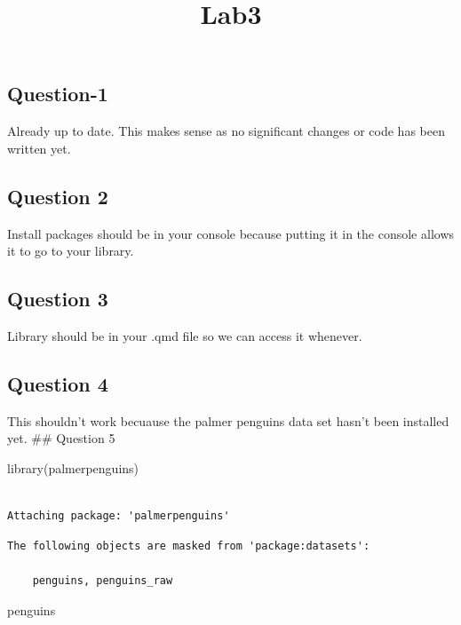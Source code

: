 \documentclass[
  letterpaper,
  DIV=11,
  numbers=noendperiod]{scrartcl}
\title{Lab3}
\author{}
\date{}
\newenvironment{Shaded}{\begin{snugshade}}{\end{snugshade}}
\newcommand{\FunctionTok}[1]{\textcolor[rgb]{0.28,0.35,0.67}{#1}}
\newcommand{\NormalTok}[1]{\textcolor[rgb]{0.00,0.23,0.31}{#1}}
\begin{document}
\maketitle


\subsection{Question-1}\label{question-1}

Already up to date. This makes sense as no significant changes or code
has been written yet.

\subsection{Question 2}\label{question-2}

Install packages should be in your console because putting it in the
console allows it to go to your library.

\subsection{Question 3}\label{question-3}

Library should be in your .qmd file so we can access it whenever.

\subsection{Question 4}\label{question-4}

This shouldn't work becuause the palmer penguins data set hasn't been
installed yet. \#\# Question 5

\begin{Shaded}
\begin{Highlighting}[]
\FunctionTok{library}\NormalTok{(palmerpenguins)}
\end{Highlighting}
\end{Shaded}

\begin{verbatim}

Attaching package: 'palmerpenguins'
\end{verbatim}

\begin{verbatim}
The following objects are masked from 'package:datasets':

    penguins, penguins_raw
\end{verbatim}

\begin{Shaded}
\begin{Highlighting}[]
\NormalTok{penguins}
\end{Highlighting}
\end{Shaded}
\end{document}
